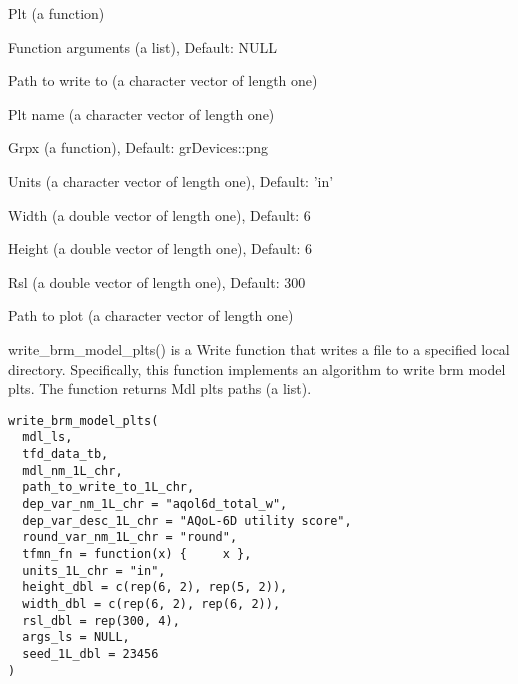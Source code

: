 \documentclass[a4paper]{book}
\begin{document}
%
\begin{Arguments}
\begin{ldescription}
\item[\code{plt\_fn}] Plt (a function)

\item[\code{fn\_args\_ls}] Function arguments (a list), Default: NULL

\item[\code{path\_to\_write\_to\_1L\_chr}] Path to write to (a character vector of length one)

\item[\code{plt\_nm\_1L\_chr}] Plt name (a character vector of length one)

\item[\code{grpx\_fn}] Grpx (a function), Default: grDevices::png

\item[\code{units\_1L\_chr}] Units (a character vector of length one), Default: 'in'

\item[\code{width\_1L\_dbl}] Width (a double vector of length one), Default: 6

\item[\code{height\_1L\_dbl}] Height (a double vector of length one), Default: 6

\item[\code{rsl\_1L\_dbl}] Rsl (a double vector of length one), Default: 300
\end{ldescription}
\end{Arguments}
%
\begin{Value}
Path to plot (a character vector of length one)
\end{Value}
%
\begin{Description}\relax
write\_brm\_model\_plts() is a Write function that writes a file to a specified local directory. Specifically, this function implements an algorithm to write brm model plts. The function returns Mdl plts paths (a list).
\end{Description}
%
\begin{Usage}
\begin{verbatim}
write_brm_model_plts(
  mdl_ls,
  tfd_data_tb,
  mdl_nm_1L_chr,
  path_to_write_to_1L_chr,
  dep_var_nm_1L_chr = "aqol6d_total_w",
  dep_var_desc_1L_chr = "AQoL-6D utility score",
  round_var_nm_1L_chr = "round",
  tfmn_fn = function(x) {     x },
  units_1L_chr = "in",
  height_dbl = c(rep(6, 2), rep(5, 2)),
  width_dbl = c(rep(6, 2), rep(6, 2)),
  rsl_dbl = rep(300, 4),
  args_ls = NULL,
  seed_1L_dbl = 23456
)
\end{verbatim}
\end{Usage}
\end{document}
